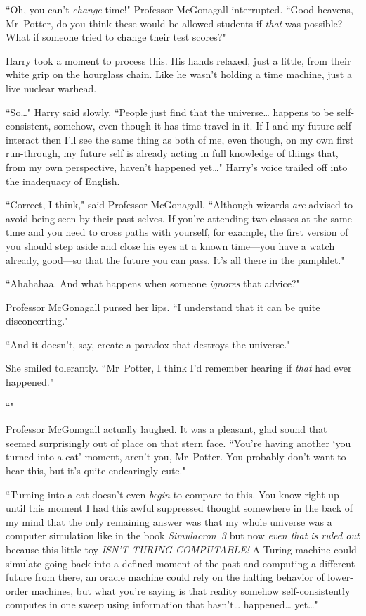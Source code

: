 ``Oh, you can't \emph{change} time!" Professor McGonagall interrupted. ``Good heavens, Mr~Potter, do you think these would be allowed students if \emph{that} was possible? What if someone tried to change their test scores?"

Harry took a moment to process this. His hands relaxed, just a little, from their white grip on the hourglass chain. Like he wasn't holding a time machine, just a live nuclear warhead.

``So{\ldots}" Harry said slowly. ``People just find that the universe{\ldots} happens to be self-consistent, somehow, even though it has time travel in it. If I and my future self interact then I'll see the same thing as both of me, even though, on my own first run-through, my future self is already acting in full knowledge of things that, from my own perspective, haven't happened yet{\ldots}" Harry's voice trailed off into the inadequacy of English.

``Correct, I think," said Professor McGonagall. ``Although wizards \emph{are} advised to avoid being seen by their past selves. If you're attending two classes at the same time and you need to cross paths with yourself, for example, the first version of you should step aside and close his eyes at a known time—you have a watch already, good—so that the future you can pass. It's all there in the pamphlet."

``Ahahahaa. And what happens when someone \emph{ignores} that advice?"

Professor McGonagall pursed her lips. ``I understand that it can be quite disconcerting."

``And it doesn't, say, create a paradox that destroys the universe."

She smiled tolerantly. ``Mr~Potter, I think I'd remember hearing if \emph{that} had ever happened."

``"

Professor McGonagall actually laughed. It was a pleasant, glad sound that seemed surprisingly out of place on that stern face. ``You're having another `you turned into a cat' moment, aren't you, Mr~Potter. You probably don't want to hear this, but it's quite endearingly cute."

``Turning into a cat doesn't even \emph{begin} to compare to this. You know right up until this moment I had this awful suppressed thought somewhere in the back of my mind that the only remaining answer was that my whole universe was a computer simulation like in the book \emph{Simulacron~3} but now \emph{even that is ruled out} because this little toy \emph{ISN'T TURING COMPUTABLE!} A Turing machine could simulate going back into a defined moment of the past and computing a different future from there, an oracle machine could rely on the halting behavior of lower-order machines, but what you're saying is that reality somehow self-consistently computes in one sweep using information that hasn't{\ldots} happened{\ldots} yet{\ldots}"

